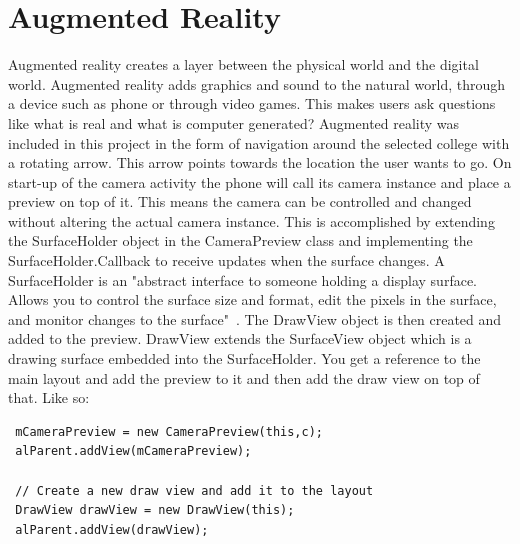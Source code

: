 \pagebreak
\section{Augmented Reality}
Augmented reality creates a layer between the physical world and the digital world. Augmented reality adds graphics and sound to the natural world, through a device such as phone or through video games. This makes users ask questions like what is real and what is computer generated? Augmented reality was included in this project in the form of navigation around the selected college with a rotating arrow. This arrow points towards the location the user wants to go. On start-up of the camera activity the phone will call its camera instance and place a preview on top of it. This means the camera can be controlled and changed without altering the actual camera instance. This is accomplished by extending the SurfaceHolder object in the CameraPreview class and implementing the SurfaceHolder.Callback to receive updates when the surface changes. A SurfaceHolder is an "abstract interface to someone holding a display surface. Allows you to control the surface size and format, edit the pixels in the surface, and monitor changes to the surface"~\cite{surfaceholder}. The DrawView object is then created and added to the preview. DrawView extends the SurfaceView object which is a drawing surface embedded into the SurfaceHolder. You get a reference to the main layout and add the preview to it and then add the draw view on top of that. Like so: 
\begin{verbatim}
 mCameraPreview = new CameraPreview(this,c);
 alParent.addView(mCameraPreview);
 
 // Create a new draw view and add it to the layout
 DrawView drawView = new DrawView(this);
 alParent.addView(drawView);
\end{verbatim}

